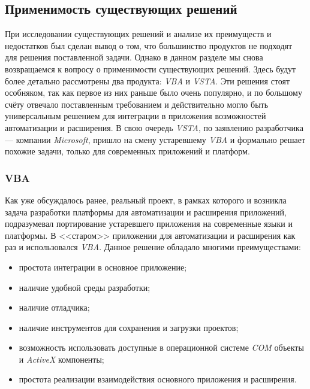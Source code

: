 \subsection{Применимость существующих решений}

При исследовании существующих решений и анализе их преимуществ и недостатков был сделан вывод о том, что большинство продуктов не подходят для решения поставленной задачи. Однако в данном разделе мы снова возвращаемся к вопросу о применимости существующих решений. Здесь будут более детально рассмотрены два продукта: {\it VBA} и {\it VSTA}. Эти решения стоят особняком, так как первое из них раньше было очень популярно, и по большому счёту отвечало поставленным требованием и действительно могло быть универсальным решением для интеграции в приложения возможностей автоматизации и расширения. В свою очередь {\it VSTA}, по заявлению разработчика --- компании {\it Microsoft}, пришло на смену устаревшему {\it VBA} и формально решает похожие задачи, только для современных приложений и платформ. 


\subsubsection{VBA}

Как уже обсуждалось ранее, реальный проект, в рамках которого и возникла задача разработки платформы для автоматизации и расширения приложений, подразумевал портирование устаревшего приложения на современные языки и платформы. В <<старом>> приложении для автоматизации и расширения как раз и использовался {\it VBA}. Данное решение обладало многими преимуществами:
\begin{itemize}
\item простота интеграции в основное приложение;
\item наличие удобной среды разработки;
\item наличие отладчика;
\item наличие инструментов для сохранения и загрузки проектов;
\item возможность использовать доступные в операционной системе {\it COM}  объекты и {\it ActiveX} компоненты;
\item простота реализации взаимодействия основного приложения и расширения.
\end{itemize}

